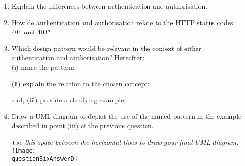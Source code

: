 
\pgfmathsetmacro{}

\begin{enumerate}[a]
    \item {} Explain the differences between authentication and authorisation.\\
	\ifdefined\questionSixAnswerA
	  \answer\questionSixAnswerA
	\else
	\fi
	




\vskip 15pt
    \item {} How do authentication and authorisation relate to the HTTP status codes 401 and 403?\\
	\ifdefined\questionSixAnswerB
	  \answer\questionSixAnswerB
	\else
	\fi





\vskip 15pt
    \item {} Which design pattern would be relevant in the context of either authentication and authorisation?  Hereafter: \\
		(i) name the pattern: \ %
			\ifdefined\questionSixAnswerCpattern
			  \newline\answer\questionSixAnswerCpattern
			\else
			\fi

		(ii) explain the relation to the chosen concept: \ %
			\ifdefined\questionSixAnswerCexplanation
			  \newline\answer\questionSixAnswerCexplanation
			\else
			  \dodotrule{.95}
			\fi
		
		and, (iii) provide a clarifying example: \ %
			\ifdefined\questionSixAnswerCexample
			  \newline\answer\questionSixAnswerCexample
			\else
			\fi




\vskip 15pt
	\item {} Draw a UML diagram to depict the use of the named pattern in the example described in point (iii) of the previous question.

\fullline\vspace{-8pt}
\begin{center}{
	\scriptsize{\emph{Use this space between the horizontal lines to draw your final UML diagram.}}
	\texttt{[image: \\questionSixAnswerD]}
	}
\end{center}
\vfill
\fullline

\end{enumerate}




